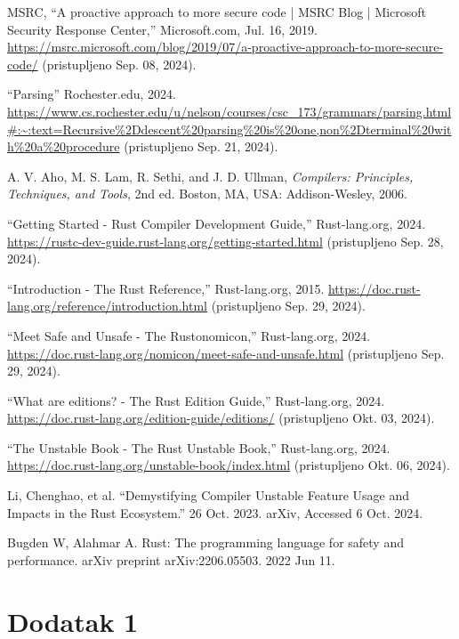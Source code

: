\documentclass[11pt]{article}
\begin{document}
\begin{thebibliography}
    \raggedright
{} 
    MSRC, “A proactive approach to more secure code | MSRC Blog | 
    Microsoft Security Response Center,” Microsoft.com, Jul. 16, 2019. 
    \url{https://msrc.microsoft.com/blog/2019/07/a-proactive-approach-to-more-secure-code/} 
    (pristupljeno Sep. 08, 2024).

    “Parsing” Rochester.edu, 2024.
    \url{https://www.cs.rochester.edu/u/nelson/courses/csc_173/grammars/parsing.html#:~:text=Recursive%2Ddescent%20parsing%20is%20one,non%2Dterminal%20with%20a%20procedure} 
    (pristupljeno Sep. 21, 2024).

    A. V. Aho, M. S. Lam, R. Sethi, and J. D. Ullman, \emph{Compilers: Principles, Techniques, and Tools}, 2nd ed. Boston, MA, USA: Addison-Wesley, 2006.

    “Getting Started - Rust Compiler Development Guide,” Rust-lang.org, 2024. 
    \url{https://rustc-dev-guide.rust-lang.org/getting-started.html} (pristupljeno Sep. 28, 2024).

    “Introduction - The Rust Reference,” Rust-lang.org, 2015. 
    \url{https://doc.rust-lang.org/reference/introduction.html} (pristupljeno Sep. 29, 2024).
    
    “Meet Safe and Unsafe - The Rustonomicon,” Rust-lang.org, 2024. 
    \url{https://doc.rust-lang.org/nomicon/meet-safe-and-unsafe.html} (pristupljeno Sep. 29, 2024).

    “What are editions? - The Rust Edition Guide,” Rust-lang.org, 2024.
    \url{https://doc.rust-lang.org/edition-guide/editions/} (pristupljeno Okt. 03, 2024).

    “The Unstable Book - The Rust Unstable Book,” Rust-lang.org, 2024. 
    \url{https://doc.rust-lang.org/unstable-book/index.html} (pristupljeno Okt. 06, 2024).

    Li, Chenghao, et al. “Demystifying Compiler Unstable Feature Usage and Impacts in the Rust Ecosystem.” 26 Oct. 2023. arXiv, Accessed 6 Oct. 2024. 

    Bugden W, Alahmar A. Rust: The programming language for safety and performance. arXiv preprint arXiv:2206.05503. 2022 Jun 11.
\end{thebibliography}

\newpage
\section{Dodatak 1}
\end{document}
